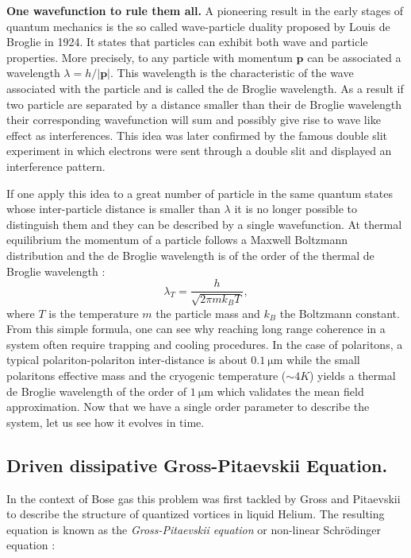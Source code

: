 \textbf{One wavefunction to rule them all.} A pioneering result in the early stages of quantum mechanics is the so called wave-particle duality proposed by Louis de Broglie \cite{deBroglie1925} in 1924.
It states that particles can exhibit both wave and particle properties. 
More precisely, to any particle with momentum $\mathbf{p}$ can be associated a wavelength $\lambda=h/|\mathbf{p}|$. This wavelength is the characteristic of the wave associated with the particle and is called the de Broglie wavelength. 
As a result if two particle are separated by a distance smaller than their de Broglie wavelength their corresponding wavefunction will sum and possibly give rise to wave like effect as interferences.
This idea was later confirmed by the famous double slit experiment in which electrons were sent through a double slit and displayed an interference pattern.

If one apply this idea to a great number of particle in the same quantum states whose inter-particle distance is smaller than $\lambda$ it is no longer possible to distinguish them and they can be described by a single wavefunction.
At thermal equilibrium the momentum of a particle follows a Maxwell Boltzmann distribution and the de Broglie wavelength is of the order of the thermal de Broglie wavelength :
\begin{equation}
    \lambda_T = \dfrac{h}{\sqrt{2\pi m k_B T}},
    \label{eq:thermal_deBroglie}
\end{equation}
where $T$ is the temperature $m$ the particle mass and $k_B$ the Boltzmann constant. From this simple formula, one can see why reaching long range coherence in a system often require trapping and cooling procedures. In the case of polaritons,
a typical polariton-polariton inter-distance is about $\SI{0,1}{\micro\meter}$ while the small polaritons effective mass and the cryogenic temperature ($\sim 4K$) yields a thermal de Broglie wavelength of the order of $\SI{1}{\micro\meter}$ which validates the mean field approximation.
Now that we have a single order parameter to describe the system, let us see how it evolves in time.

\bigskip

\subsection{Driven dissipative Gross-Pitaevskii Equation.}
In the context of Bose gas this problem was first tackled by Gross \cite{Gross1961} and Pitaevskii \cite{pitaevskii1961} to describe
the structure of quantized vortices in liquid Helium. The resulting equation is known as the \textit{Gross-Pitaevskii equation} or non-linear Schrödinger equation :

